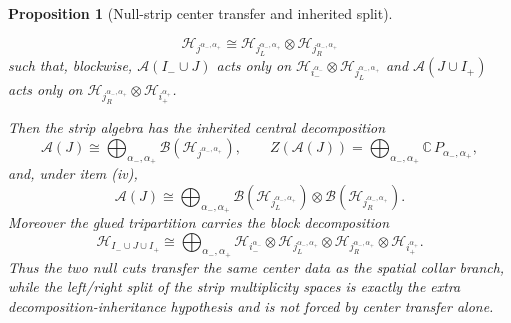 \documentclass[11pt]{article}
\newtheorem{proposition}[theorem]{Proposition}
\begin{document}
\begin{proposition}[Null-strip center transfer and inherited split]
\begin{enumerate}[leftmargin=2em,label=(\roman*)]
\[\mathcal H_{j^{\alpha_-,\alpha_+}}
\cong
\mathcal H_{j_L^{\alpha_-,\alpha_+}}\otimes
\mathcal H_{j_R^{\alpha_-,\alpha_+}}
\]
such that, blockwise, \(\mathcal A(I_-\cup J)\) acts only on
\(\mathcal H_{i_-^{\alpha_-}}\otimes \mathcal H_{j_L^{\alpha_-,\alpha_+}}\)
and \(\mathcal A(J\cup I_+)\) acts only on
\(\mathcal H_{j_R^{\alpha_-,\alpha_+}}\otimes \mathcal H_{i_+^{\alpha_+}}\).
\end{enumerate}
Then the strip algebra has the inherited central decomposition
\[
\mathcal A(J)
\cong
\bigoplus_{\alpha_-,\alpha_+}
\mathcal B(\mathcal H_{j^{\alpha_-,\alpha_+}}),
\qquad
Z(\mathcal A(J))
=
\bigoplus_{\alpha_-,\alpha_+}\mathbb C\,P_{\alpha_-,\alpha_+},
\]
and, under item (iv),
\[
\mathcal A(J)
\cong
\bigoplus_{\alpha_-,\alpha_+}
\mathcal B(\mathcal H_{j_L^{\alpha_-,\alpha_+}})
\otimes
\mathcal B(\mathcal H_{j_R^{\alpha_-,\alpha_+}}).
\]
Moreover the glued tripartition carries the block decomposition
\[
\mathcal H_{I_-\cup J\cup I_+}
\cong
\bigoplus_{\alpha_-,\alpha_+}
\mathcal H_{i_-^{\alpha_-}}
\otimes
\mathcal H_{j_L^{\alpha_-,\alpha_+}}
\otimes
\mathcal H_{j_R^{\alpha_-,\alpha_+}}
\otimes
\mathcal H_{i_+^{\alpha_+}}.
\]
Thus the two null cuts transfer the same center data as the spatial collar branch, while the left/right split of the strip multiplicity spaces is exactly the extra decomposition-inheritance hypothesis and is not forced by center transfer alone.
\end{proposition}
\end{document}
